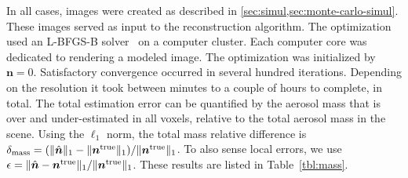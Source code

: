 \documentclass[10pt,letterpaper]{article}
\begin{document}
In all cases, images were created as described
in \cref{sec:simul,sec:monte-carlo-simul}. These images served as input to the reconstruction algorithm. The optimization used an L-BFGS-B solver~\cite{BFGS} on a computer cluster. Each computer core was dedicated to rendering a modeled image. The optimization was initialized
by ${\bm n}=0$.  Satisfactory convergence occurred in several hundred
iterations. Depending on the resolution it took between minutes to a
couple of hours to complete, in total. The total estimation
error can be quantified by the aerosol mass that is over and under-estimated
in all voxels, relative to the total aerosol mass in the scene. Using the $\ell_1$ norm,
the total mass relative difference is
$\delta_{\rm mass}=(\|\hat{\bm n}\|_1 - \|{\bm n}^{\rm true} \|_1) / \| {\bm n}^{\rm true} \|_1$.
To also sense local errors, we use
 $\epsilon=\|
\hat{\bm n} - {\bm n}^{\rm true} \|_1 / \| {\bm n}^{\rm true} \|_1$.
These results are listed in Table~\ref{tbl:mass}. \\
\end{document}
